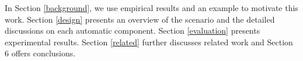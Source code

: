 In Section \ref{background}, we use empirical results and an example to motivate this work. Section \ref{design} presents an overview of the scenario and the detailed discussions on each automatic component. Section \ref{evaluation} presents experimental results. Section \ref{related} further discusses related work and Section 6 offers conclusions.

\begin{comment}
1. Aspects of software engineering benefit from automated tools.

2. Static analysis is essential for automated tools.

3. Static analysis design is difficult and is hard to write "good" static analysis, because static analysis needs to be specially designed for features. (examples of bad analyses)

4. One most time-consuming process during program analysis design is localization bottlenecks. It requires expertise, understanding of the code, etc. (like what the fault localization phase for debugging).

5. Despite of the importance, this process lacks tool support. motivated us to design automatics approaches for this process.

6. The goals: (i)identifies the root causes of analysis imprecision and performance badness, (ii) limited suggestion improvement.

7. focus on static points-to analysis; the root causes are identified as variables/properties; the improvements are context sensitivity.

8. summary of approaches: (i) labeled propagations system for history info; (ii) root cause localizations with heuristics; (iii) improvement suggestion via dynamic information. Finally, we have conducted evaluations on the approaches.

9. Major contributions:

\begin{itemize}

\item We present the first work that focuses on supporting static analysis design with automatic bottleneck localization, a time-consuming process. Identify root causes of imprecision, and therefore the impact on performance.

\item We present a general idea that uses the dynamic information to automatically suggest the context sensitivity for significant precision improvement on identified analysis bottlenecks.

\item We have conducted empirical evaluation of the proposed approaches and illustrated the effectiveness of automatic bottleneck localization. concrete data.

\end{itemize}
\end{comment}